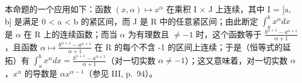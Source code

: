 本命题的一个应用如下：函数 \((x, \alpha) \mapsto x^{\alpha}\) 在乘积 I × J 上连续，其中 I = {[}a, b{]} 是满足 0 \textless{} a \textless{} b 的紧区间，而 J 是 R 中的任意紧区间；由此断定 \(\int_{a}^{b} x^{\alpha} dx\) 是 \(\alpha\) 在 R 上的连续函数；而当 \(\alpha\) 为有理数且 \(\neq -1\) 时，这个函数等于 \(\frac{b^{\alpha+1} - a^{\alpha+1}}{\alpha + 1}\)，且函数 \(\alpha \mapsto \frac{b^{\alpha+1} - a^{\alpha+1}}{\alpha + 1}\) 在 R 的每个不含 -1 的区间上连续；于是（恒等式的延拓）有 \(\int_{a}^{b} x^{\alpha} dx = \frac{b^{\alpha+1} - a^{\alpha+1}}{\alpha + 1}\)（对一切实数 \(\alpha \neq -1\)）；这又意味着，对一切实数 \(\alpha\)，\(x^{\alpha}\) 的导数是 \(\alpha x^{\alpha-1}\)（参见 III, p.~94）。

